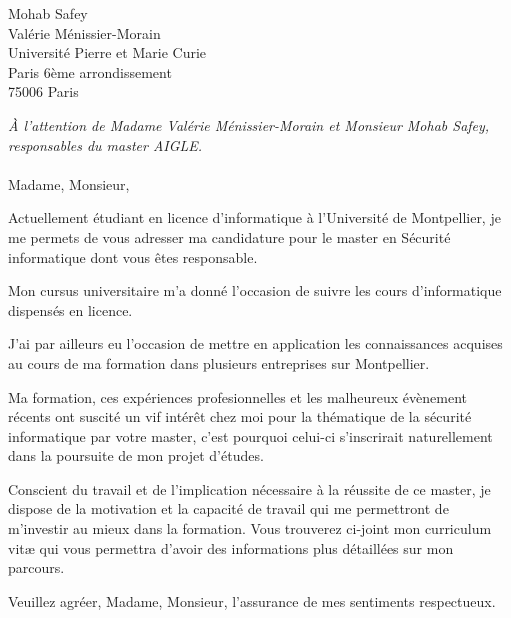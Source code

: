 \documentclass{lettre}
\begin{document}
\begin{letter}{
    Mohab Safey\\
Valérie Ménissier-Morain\\
    Université Pierre et Marie Curie\\
    Paris 6ème arrondissement\\
    75006 Paris
}
    \date{\today}

    \address{3 rue des abricotiers\\66500 Ria-Sirach}
    \nofax


    \opening{
        \emph{À l'attention de Madame Valérie Ménissier-Morain et Monsieur     Mohab Safey, responsables du master AIGLE.}
        \\ \\Madame, Monsieur,
}        

    Actuellement étudiant en licence d'informatique à l'Université de Montpellier, je me permets de vous adresser ma candidature pour le master en Sécurité informatique dont vous êtes responsable.

    Mon cursus universitaire m'a donné l'occasion de suivre les cours d'informatique dispensés en licence.

    J'ai par ailleurs eu l'occasion de mettre en application les connaissances acquises au cours de ma formation dans plusieurs entreprises sur Montpellier.

    Ma formation, ces expériences profesionnelles et les malheureux évènement récents ont suscité un vif intérêt chez moi pour la thématique de la sécurité informatique par votre master, c'est pourquoi celui-ci s'inscrirait naturellement dans la poursuite de mon projet d'études.

    Conscient du travail et de l'implication nécessaire à la réussite de ce master, je dispose de la motivation et la capacité de travail qui me permettront de m'investir au mieux dans la formation. Vous trouverez ci-joint mon curriculum vit\ae{} qui vous permettra d'avoir des informations plus détaillées sur mon parcours.

    \closing{Veuillez agréer, Madame, Monsieur, l'assurance de mes sentiments respectueux.}
\end{letter}
\end{document}
